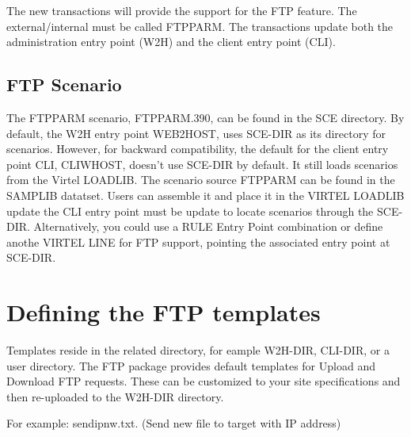 \documentclass[letterpaper,10pt,english]{sphinxmanual}
\begin{document}
The new transactions will provide the support for the FTP feature. The external/internal must be called FTPPARM. The transactions update both the administration entry point (W2H) and the client entry point (CLI).




\subsection{FTP Scenario}
\label{\detokenize{Customization:ftp-scenario}}
The FTPPARM scenario, FTPPARM.390, can be found in the SCE directory. By default, the W2H entry point WEB2HOST, uses SCE-DIR as its directory for scenarios. However, for backward compatibility, the default for the client entry point CLI, CLIWHOST, doesn’t use SCE-DIR by default. It still loads scenarios from the Virtel LOADLIB. The scenario source FTPPARM can be found in the SAMPLIB datatset. Users can assemble it and place it in the VIRTEL LOADLIB  update the CLI entry point must be update to locate scenarios through the SCE-DIR. Alternatively, you could use a RULE \textbar{} Entry Point combination or define anothe VIRTEL LINE for FTP support, pointing the associated entry point at SCE-DIR.


\section{Defining the FTP templates}
\label{\detokenize{Customization:defining-the-ftp-templates}}
Templates reside in the related directory, for eample W2H-DIR, CLI-DIR, or a user directory. The FTP package provides default templates for Upload and Download FTP requests. These can be customized to your site specifications and then re-uploaded to the W2H-DIR directory.

For example: sendipnw.txt. (Send new file to target with IP address)
\end{document}
